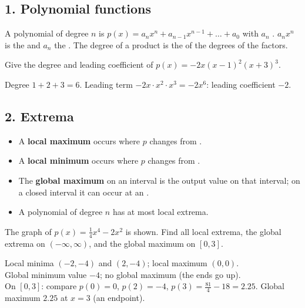 \subsection*{1. Polynomial functions}
A polynomial of degree $n$ is $p(x)=a_nx^n+a_{n-1}x^{n-1}+\dots+a_0$ with $a_n$ . $a_nx^n$ is the  and $a_n$ the . The degree of a product is the  of the degrees of the factors.

Give the degree and leading coefficient of $p(x)=-2x(x-1)^2(x+3)^3$.
\begin{workspace}[2.2cm]
Degree $1+2+3=6$. Leading term $-2x\cdot x^2\cdot x^3=-2x^6$: leading coefficient $-2$.
\end{workspace}

\subsection*{2. Extrema}
\begin{keyidea}
\begin{itemize}
\item A \textbf{local maximum} occurs where $p$ changes from .
\item A \textbf{local minimum} occurs where $p$ changes from .
\item The \textbf{global maximum} on an interval is the  output value on that interval; on a closed interval it can occur at an .
\item A polynomial of degree $n$ has at most  local extrema.
\end{itemize}
\end{keyidea}

\begin{center}
\end{center}
The graph of $p(x)=\frac14x^4-2x^2$ is shown. Find all local extrema, the global extrema on $(-\infty,\infty)$, and the global maximum on $[0,3]$.
\begin{workspace}[3.2cm]
Local minima $(-2,-4)$ and $(2,-4)$; local maximum $(0,0)$.\\
Global minimum value $-4$; no global maximum (the ends go up).\\
On $[0,3]$: compare $p(0)=0$, $p(2)=-4$, $p(3)=\frac{81}{4}-18=2.25$. Global maximum $2.25$ at $x=3$ (an endpoint).
\end{workspace}

